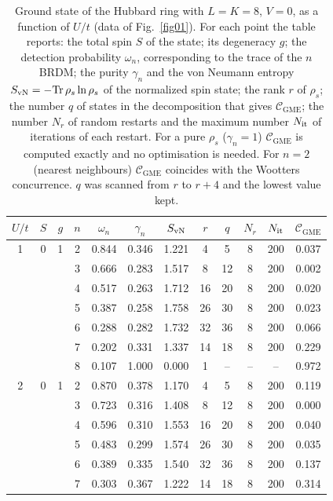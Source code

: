 \documentclass[12pt]{article}
\begin{document}
\begin{table}
\caption{Ground state of the Hubbard ring with $L=K=8$, $V=0$, as a function of $U/t$ (data of Fig.~\ref{fig01}). For each point the table reports: the total spin $S$ of the state; its degeneracy $g$; the detection probability $\omega_n$, corresponding to the trace of the $n$BRDM; the purity $\gamma_n$ and the von Neumann entropy $S_{\rm vN}=-\mathrm{Tr}\,\rho_s\ln\rho_s$ of the normalized spin state; the rank $r$ of $\rho_s$; the number $q$ of states in the decomposition that gives $\mathcal{C}_{\mathrm{GME}}$; the number $N_r$ of random restarts and the maximum number $N_{\rm it}$ of iterations of each restart. For a pure $\rho_s$ ($\gamma_n=1$) $\mathcal{C}_{\mathrm{GME}}$ is computed exactly and no optimisation is needed. For $n=2$ (nearest neighbours) $\mathcal{C}_{\mathrm{GME}}$ coincides with the Wootters concurrence. $q$ was scanned from $r$ to $r+4$ and the lowest value kept.}
\label{tab:uscan_gs_L8}
\begin{ruledtabular}
\begin{tabular}{cccccccccccc}
$U/t$ & $S$ & $g$ & $n$ & $\omega_n$ & $\gamma_n$ & $S_{\rm vN}$ & $r$ & $q$ & $N_r$ & $N_{\rm it}$ & $\mathcal{C}_{\mathrm{GME}}$ \\
\hline
1 & 0 & 1 & 2 & 0.844 & 0.346 & 1.221 & 4 & 5 & 8 & 200 & 0.037 \\
 & &  & 3 & 0.666 & 0.283 & 1.517 & 8 & 12 & 8 & 200 & 0.002 \\
 & &  & 4 & 0.517 & 0.263 & 1.712 & 16 & 20 & 8 & 200 & 0.020 \\
 & &  & 5 & 0.387 & 0.258 & 1.758 & 26 & 30 & 8 & 200 & 0.023 \\
 & &  & 6 & 0.288 & 0.282 & 1.732 & 32 & 36 & 8 & 200 & 0.066 \\
 & &  & 7 & 0.202 & 0.331 & 1.337 & 14 & 18 & 8 & 200 & 0.229 \\
 & &  & 8 & 0.107 & 1.000 & 0.000 & 1 & -- & -- & -- & 0.972 \\
\hline
2 & 0 & 1 & 2 & 0.870 & 0.378 & 1.170 & 4 & 5 & 8 & 200 & 0.119 \\
 & &  & 3 & 0.723 & 0.316 & 1.408 & 8 & 12 & 8 & 200 & 0.000 \\
 & &  & 4 & 0.596 & 0.310 & 1.553 & 16 & 20 & 8 & 200 & 0.040 \\
 & &  & 5 & 0.483 & 0.299 & 1.574 & 26 & 30 & 8 & 200 & 0.035 \\
 & &  & 6 & 0.389 & 0.335 & 1.540 & 32 & 36 & 8 & 200 & 0.137 \\
 & &  & 7 & 0.303 & 0.367 & 1.222 & 14 & 18 & 8 & 200 & 0.314 \\

\end{tabular}
\end{ruledtabular}
\end{table}
\end{document}
